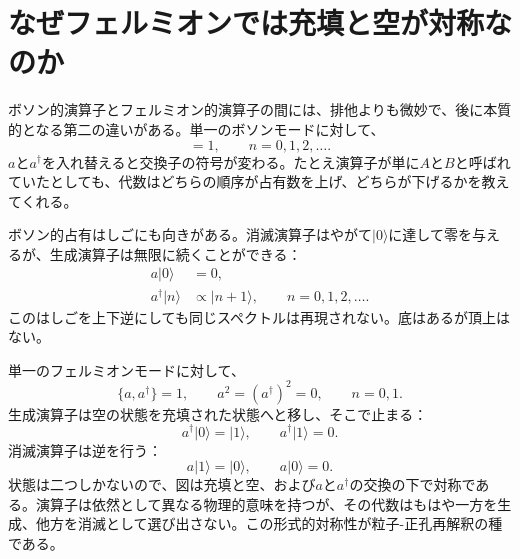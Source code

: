 \section{なぜフェルミオンでは充填と空が対称なのか}

ボソン的演算子とフェルミオン的演算子の間には、排他よりも微妙で、後に本質的となる第二の違いがある。単一のボソンモードに対して、
\begin{equation}
[a,a^\dagger]=1,
\qquad
n=0,1,2,\ldots.
\end{equation}
\(a\)と\(a^\dagger\)を入れ替えると交換子の符号が変わる。たとえ演算子が単に\(A\)と\(B\)と呼ばれていたとしても、代数はどちらの順序が占有数を上げ、どちらが下げるかを教えてくれる。

ボソン的占有はしごにも向きがある。消滅演算子はやがて\(\lvert0\rangle\)に達して零を与えるが、生成演算子は無限に続くことができる：
\begin{align}
a\lvert0\rangle&=0,\\
a^\dagger\lvert n\rangle&\propto\lvert n+1\rangle,
\qquad n=0,1,2,\ldots.
\end{align}
このはしごを上下逆にしても同じスペクトルは再現されない。底はあるが頂上はない。

単一のフェルミオンモードに対して、
\begin{equation}
\{a,a^\dagger\}=1,
\qquad
a^2=(a^\dagger)^2=0,
\qquad
n=0,1.
\label{eq:l10-fermion-mode}
\end{equation}
生成演算子は空の状態を充填された状態へと移し、そこで止まる：
\begin{equation}
a^\dagger\lvert0\rangle=\lvert1\rangle,
\qquad
a^\dagger\lvert1\rangle=0.
\end{equation}
消滅演算子は逆を行う：
\begin{equation}
a\lvert1\rangle=\lvert0\rangle,
\qquad
a\lvert0\rangle=0.
\end{equation}
状態は二つしかないので、図は充填と空、および\(a\)と\(a^\dagger\)の交換の下で対称である。演算子は依然として異なる物理的意味を持つが、その代数はもはや一方を生成、他方を消滅として選び出さない。この形式的対称性が粒子-正孔再解釈の種である。

\begin{classroomqa}
\end{classroomqa}

